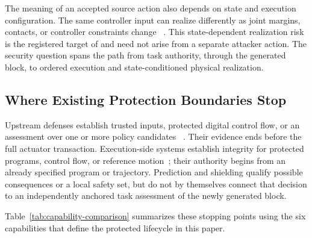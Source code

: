 The meaning of an accepted source action also depends on state and execution
configuration.  The same controller input can realize differently as joint
margins, contacts, or controller constraints change
~\cite{vlmpc2024,safetychance2024,measurementrobustcbf2021,
realizableshields2025}.  This state-dependent realization risk is the registered
target of \ltwob and need not arise from a separate attacker action.  The
security question spans the path from task authority, through the generated
block, to ordered execution and state-conditioned physical realization.

\subsection{Where Existing Protection Boundaries Stop}

Upstream defenses establish trusted inputs, protected digital control flow, or
an assessment over one or more policy candidates
~\cite{struq2025,secalign2025,camel2026,ace2026,sealvla2026,covervla2026}.
Their evidence ends before the full actuator transaction.  Execution-side
systems establish integrity for protected programs, control flow, or reference
motion~\cite{diat2019,cfaplus2024,arto2026,scaphy2023,tat2026}; their authority
begins from an already specified program or trajectory.  Prediction and
shielding qualify possible consequences or a local safety set, but do not by
themselves connect that decision to an independently anchored task assessment of
the newly generated block.

Table~\ref{tab:capability-comparison} summarizes these stopping points using
the six capabilities that define the protected lifecycle in this paper.

